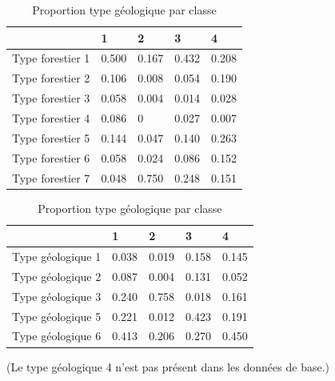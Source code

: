 \documentclass{article}
\begin{document}
\newpage
\begin{table}[H]
    \centering
    \begin{minipage}{0.48\textwidth} %
        \centering
        \begin{tabular}{|l|l|l|l|l|}
        \hline
                            & 1     & 2     & 3     & 4     \\ \hline
        Type forestier 1                   & 0.500 & 0.167 & 0.432 & 0.208 \\ \hline
        Type forestier 2                   & 0.106 & 0.008 & 0.054 & 0.190 \\ \hline
        Type forestier 3                   & 0.058 & 0.004 & 0.014 & 0.028 \\ \hline
        Type forestier 4                   & 0.086 & 0     & 0.027 & 0.007 \\ \hline
        Type forestier 5                   & 0.144 & 0.047 & 0.140 & 0.263 \\ \hline
        Type forestier 6                   & 0.058 & 0.024 & 0.086 & 0.152 \\ \hline
        Type forestier 7                   & 0.048 & 0.750 & 0.248 & 0.151 \\ \hline
        \end{tabular}
        \caption{Proportion type forestier par classe}
    \end{minipage}\hfill %
    \begin{minipage}{0.48\textwidth} %
        \centering

        \begin{tabular}{|l|l|l|l|l|}
        \hline
                            & 1     & 2     & 3     & 4     \\ \hline
        Type géologique 1                   & 0.038 & 0.019 & 0.158 & 0.145 \\ \hline
        Type géologique 2                   & 0.087 & 0.004 & 0.131 & 0.052 \\ \hline
        Type géologique 3                   & 0.240 & 0.758 & 0.018 & 0.161 \\ \hline
        Type géologique 5                   & 0.221 & 0.012 & 0.423 & 0.191 \\ \hline
        Type géologique 6                   & 0.413 & 0.206 & 0.270 & 0.450 \\ \hline
        \end{tabular}
        \caption{Proportion type géologique par classe}
    \end{minipage}
\end{table}
(Le type géologique 4 n'est pas présent dans les données de base.)
\\
\end{document}
